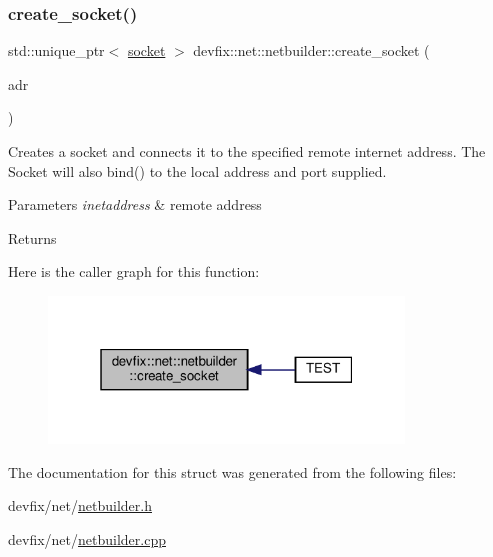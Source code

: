 \subsubsection{\texorpdfstring{create\+\_\+socket()}{create\_socket()}}
{\footnotesize\ttfamily std\+::unique\+\_\+ptr$<$ \hyperlink{structdevfix_1_1net_1_1socket}{socket} $>$ devfix\+::net\+::netbuilder\+::create\+\_\+socket (\begin{DoxyParamCaption}\item[{\hyperlink{structdevfix_1_1net_1_1inetaddress}{inetaddress}}]{adr }\end{DoxyParamCaption})\hspace{0.3cm}{\ttfamily [static]}}



Creates a socket and connects it to the specified remote internet address. The Socket will also bind() to the local address and port supplied. 


\begin{DoxyParams}{Parameters}
{\em inetaddress} & remote address \\
\hline
\end{DoxyParams}
\begin{DoxyReturn}{Returns}

\end{DoxyReturn}
Here is the caller graph for this function\+:\nopagebreak
\begin{figure}[H]
\begin{center}
\leavevmode
\includegraphics[width=268pt]{structdevfix_1_1net_1_1netbuilder_a9d9eb6cb050ca920aa647baaf4692405_icgraph}
\end{center}
\end{figure}


The documentation for this struct was generated from the following files\+:\begin{DoxyCompactItemize}
\item 
devfix/net/\hyperlink{netbuilder_8h}{netbuilder.\+h}\item 
devfix/net/\hyperlink{netbuilder_8cpp}{netbuilder.\+cpp}\end{DoxyCompactItemize}
